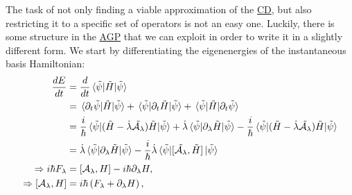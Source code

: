 \documentclass[a4paper,oneside,11pt]{book}
\newcommand{\dlambda}{\partial_{\lambda}}
\newcommand{\AGP}[1]{\mathcal{A}_{#1}}
\newcommand{\dotlambda}{\dot{\lambda}}
\newcommand{\acrref}[1]{\hyperref[acr:#1]{#1}}
\providecommand{\DIFaddbegin}{} %
\providecommand{\DIFaddend}{} %
\providecommand{\DIFdelbegin}{} %
\providecommand{\DIFdelend}{} %
\newcommand{\DIFscaledelfig}{0.5}
\newlength{\DIFdelgraphicswidth} %
\newlength{\DIFdelgraphicsheight} %
\newcommand{\DIFaddincludegraphics}[2][]{{\color{blue}\fbox{\DIFOincludegraphics[#1]{#2}}}} %
\newcommand{\DIFdelincludegraphics}[2][]{%
\sbox{\DIFdelgraphicsbox}{\DIFOincludegraphics[#1]{#2}}%
\settoboxwidth{\DIFdelgraphicswidth}{\DIFdelgraphicsbox} %
\settoboxtotalheight{\DIFdelgraphicsheight}{\DIFdelgraphicsbox} %
\scalebox{\DIFscaledelfig}{%
\parbox[b]{\DIFdelgraphicswidth}{\usebox{\DIFdelgraphicsbox}\\[-\baselineskip] \rule{\DIFdelgraphicswidth}{0em}}\llap{\resizebox{\DIFdelgraphicswidth}{\DIFdelgraphicsheight}{%
\setlength{\unitlength}{\DIFdelgraphicswidth}%
\begin{picture}(1,1)%
\thicklines\linethickness{2pt} %
{\color[rgb]{1,0,0}\put(0,0){\framebox(1,1){}}}%
{\color[rgb]{1,0,0}\put(0,0){\line( 1,1){1}}}%
{\color[rgb]{1,0,0}\put(0,1){\line(1,-1){1}}}%
\end{picture}%
}\hspace*{3pt}}} %
} %
\DeclareRobustCommand{\DIFaddbegin}{\DIFOaddbegin \let\includegraphics\DIFaddincludegraphics} %
\DeclareRobustCommand{\DIFaddend}{\DIFOaddend \let\includegraphics\DIFOincludegraphics} %
\DeclareRobustCommand{\DIFdelbegin}{\DIFOdelbegin \let\includegraphics\DIFdelincludegraphics} %
\DeclareRobustCommand{\DIFdelend}{\DIFOaddend \let\includegraphics\DIFOincludegraphics} %
\begin{document}
    The task of not only finding a viable approximation of the \acrref{CD}, but also restricting it to a specific set of operators is not an easy one. Luckily, there is some structure in the \acrref{AGP} that we can exploit in order to write it in a slightly different form. We start by differentiating the eigenenergies of the instantaneous basis Hamiltonian:
    \begin{equation}\label{eq:energy_derivative}
        \DIFdelbegin %
\DIFdelend \DIFaddbegin \begin{aligned}
            \frac{dE}{dt} &= \frac{d}{dt}\ev*{\Tilde{H}}{\Tilde{\psi}} \\
            &= \mel*{\partial_t \Tilde{\psi}}{\Tilde{H}}{\Tilde{\psi}} + \mel*{\Tilde{\psi}}{\partial_t \Tilde{H}}{\Tilde{\psi}} + \mel*{\Tilde{\psi}}{\Tilde{H}}{\partial_t \Tilde{\psi}} \\
            &= \frac{i}{\hbar}\ev*{(\Tilde{H} - \dotlambda \Tilde{\AGP{\lambda}})\Tilde{H}}{\Tilde{\psi}} + \dotlambda \ev*{\dlambda \Tilde{H}}{\Tilde{\psi}} - \frac{i}{\hbar}\ev*{(\Tilde{H} - \dotlambda \Tilde{\AGP{\lambda}})\Tilde{H}}{\Tilde{\psi}}\\
            &= \dotlambda \ev*{\dlambda \Tilde{H}}{\Tilde{\psi}} - \frac{i}{\hbar} \dotlambda \ev*{\comm*{\Tilde{\AGP{\lambda}}}{\Tilde{H}}}{\Tilde{\psi}} \\
            \Rightarrow i\hbar F_{\lambda} &= \comm{\AGP{\lambda}}{H} - i \hbar \dlambda H, \\
            \Rightarrow \comm{\AGP{\lambda}}{H} &= i\hbar \left( F_{\lambda} + \dlambda H\right),
        \end{aligned}\DIFaddend 
    \end{equation}
\end{document}
